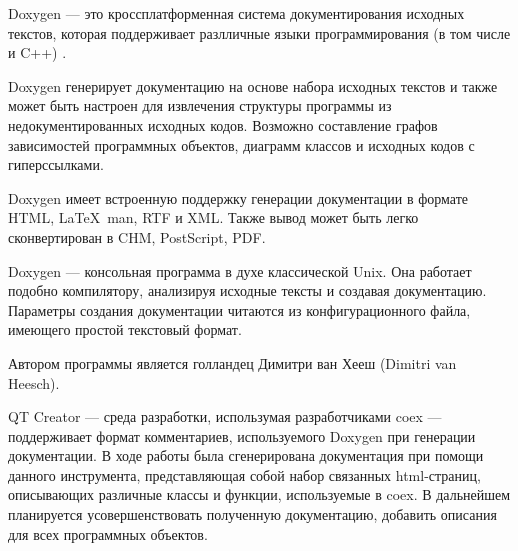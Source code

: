 Doxygen --- это кроссплатформенная система документирования исходных текстов, которая поддерживает разлличные языки программирования (в том числе и C++) \cite{doxygen}. 

Doxygen генерирует документацию на основе набора исходных текстов и также может быть настроен для извлечения структуры программы из недокументированных исходных кодов. Возможно составление графов зависимостей программных объектов, диаграмм классов и исходных кодов с гиперссылками.

Doxygen имеет встроенную поддержку генерации документации в формате HTML, \LaTeX\, man, RTF и XML. Также вывод может быть легко сконвертирован в CHM, PostScript, PDF.

Doxygen — консольная программа в духе классической Unix. Она работает подобно компилятору, анализируя исходные тексты и создавая документацию. Параметры создания документации читаются из конфигурационного файла, имеющего простой текстовый формат.

Автором программы является голландец Димитри ван Хееш (Dimitri van Heesch).

QT Creator --- среда разработки, использумая разработчиками coex --- поддерживает формат комментариев, используемого Doxygen при генерации документации. В ходе работы была сгенерирована документация при помощи данного инструмента, представляющая собой набор связанных html-страниц, описывающих различные классы и функции, используемые в coex. В дальнейшем планируется усовершенствовать полученную документацию, добавить описания для всех программных объектов.
